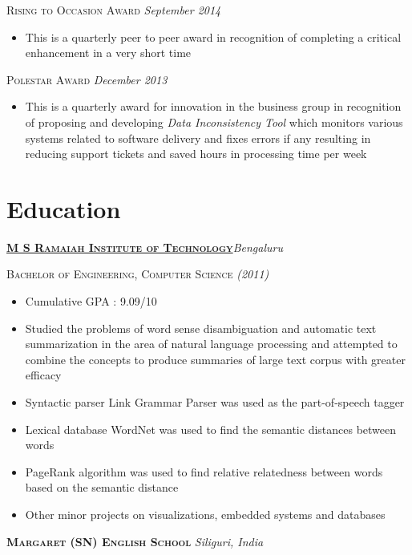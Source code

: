 \documentclass[]{article}
\begin{document}
{\raggedright\textsc{Rising to Occasion Award} \hfill {\raggedleft\textit{September 2014}}

\begin{itemize}
\item This is a quarterly peer to peer award in recognition of completing a critical enhancement in a very short time
\end{itemize}

{\raggedright\textsc{Polestar Award} \hfill {\raggedleft\textit{December 2013}}

\begin{itemize}
\item This is a quarterly award for innovation in the business group in recognition of proposing and developing \textit{Data Inconsistency Tool} which monitors various systems related to software delivery and fixes errors if any resulting in reducing support tickets and saved hours in processing time per week  
\end{itemize}

\section{Education}

{\raggedright\textsc{\textbf{\href{http://www.msrit.edu/}{M S Ramaiah Institute of Technology}}}\hfill{\raggedleft\textit{Bengaluru}}

{\raggedright\textsc{Bachelor of Engineering, Computer Science} \hfill {\raggedleft\textit{(2011)}}

\begin{itemize}
\item Cumulative GPA : 9.09/10
\item Studied the problems of word sense disambiguation and automatic text summarization in the area of natural language processing and attempted to combine the concepts to produce summaries of large text corpus with greater efficacy
\item Syntactic parser Link Grammar Parser was used as the part-of-speech tagger
\item Lexical database WordNet was used to find the semantic distances between words
\item PageRank algorithm was used to find relative relatedness between words based on the semantic distance
\item Other minor projects on visualizations, embedded systems and databases
\end{itemize}
{\raggedright\textsc{\textbf{Margaret (SN) English School}} \hfill {\raggedleft\textit{Siliguri, India}}

}}}}}
\end{document}
